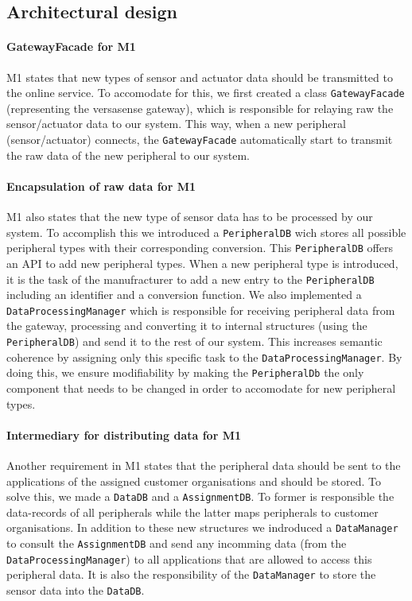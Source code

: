 \documentclass[english]{sareport}
\begin{document}
\subsection{Architectural design}
\paragraph{GatewayFacade for M1}
M1 states that new types of sensor and actuator data should be transmitted to the online service. To accomodate for this, we first created a class \texttt{GatewayFacade} (representing the versasense gateway), which is responsible for relaying raw the sensor/actuator data to our system. This way, when a new peripheral (sensor/actuator) connects, the \texttt{GatewayFacade} automatically start to transmit the raw data of the new peripheral to our system.
\paragraph{Encapsulation of raw data for M1}
M1 also states that the new type of sensor data has to be processed by our system. To accomplish this we introduced a \texttt{PeripheralDB} wich stores all possible peripheral types with their corresponding conversion. This \texttt{PeripheralDB} offers an API to add new peripheral types. When a new peripheral type is introduced, it is the task of the manufracturer to add a new entry to the \texttt{PeripheralDB} including an identifier and a conversion function. We also implemented a \texttt{DataProcessingManager} which is responsible for receiving peripheral data from the gateway, processing and converting it to internal structures (using the \texttt{PeripheralDB}) and send it to the rest of our system. This increases semantic coherence by assigning only this specific task to the \texttt{DataProcessingManager}. By doing this, we ensure modifiability by making the \texttt{PeripheralDb} the only component that needs to be changed in order to accomodate for new peripheral types.
\paragraph{Intermediary for distributing data for M1}
Another requirement in M1 states that the peripheral data should be sent to the applications of the assigned customer organisations and should be stored. To solve this, we made a \texttt{DataDB} and a \texttt{AssignmentDB}. To former is responsible the data-records of all peripherals while the latter maps peripherals to customer organisations. In addition to these new structures we indroduced a \texttt{DataManager} to consult the \texttt{AssignmentDB} and send any incomming data (from the \texttt{DataProcessingManager}) to all applications that are allowed to access this peripheral data. It is also the responsibility of the \texttt{DataManager} to store the sensor data into the \texttt{DataDB}.
\end{document}
